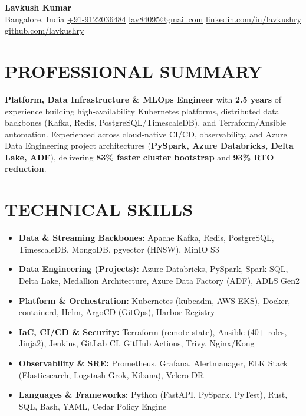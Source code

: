 \documentclass[a4paper,10pt]{article}
\begin{document}
\begin{center}
  {\fontsize{19}{21}\selectfont\bfseries\color{navy} Lavkush Kumar}\\[2.5pt]
  \small\color{soft}
  Bangalore, India \;\textbar\;
  \href{tel:+919122036484}{\color{accent}+91-9122036484} \;\textbar\;
  \href{mailto:lav84095@gmail.com}{\color{accent}lav84095@gmail.com} \;\textbar\;
  \href{https://www.linkedin.com/in/lavkushry/}{\color{accent}linkedin.com/in/lavkushry} \;\textbar\;
  \href{https://github.com/lavkushry}{\color{accent}github.com/lavkushry}
\end{center}
\vspace{-6pt}

\section{PROFESSIONAL SUMMARY}
\small\color{black}
\textbf{Platform, Data Infrastructure \& MLOps Engineer} with \textbf{2.5 years} of experience building high-availability Kubernetes platforms, distributed data backbones (Kafka, Redis, PostgreSQL/TimescaleDB), and Terraform/Ansible automation. Experienced across cloud-native CI/CD, observability, and Azure Data Engineering project architectures (\textbf{PySpark, Azure Databricks, Delta Lake, ADF}), delivering \textbf{83\% faster cluster bootstrap} and \textbf{93\% R\mbox{}TO reduction}.

\section{TECHNICAL SKILLS}
\begin{itemize}[leftmargin=0.0in, label={}, noitemsep, topsep=0.5pt, parsep=1.0pt, partopsep=0pt]
  \item \small \textbf{\color{navy}Data \& Streaming Backbones:} Apache Kafka, Redis, PostgreSQL, TimescaleDB, MongoDB, pgvector (HNSW), MinIO S3
  \item \small \textbf{\color{navy}Data Engineering (Projects):} Azure Databricks, PySpark, Spark SQL, Delta Lake, Medallion Architecture, Azure Data Factory (ADF), ADLS Gen2
  \item \small \textbf{\color{navy}Platform \& Orchestration:} Kubernetes (kubeadm, AWS EKS), Docker, containerd, Helm, ArgoCD (GitOps), Harbor Registry
  \item \small \textbf{\color{navy}IaC, CI/CD \& Security:} Terraform (remote state), Ansible (40+ roles, Jinja2), Jenkins, GitLab CI, GitHub Actions, Trivy, Nginx/Kong
  \item \small \textbf{\color{navy}Observability \& SRE:} Prometheus, Grafana, Alertmanager, ELK Stack (Elasticsearch, Logstash Grok, Kibana), Velero DR
  \item \small \textbf{\color{navy}Languages \& Frameworks:} Python (FastAPI, PySpark, PyTest), Rust, SQL, Bash, YAML, Cedar Policy Engine
\end{itemize}
\end{document}
